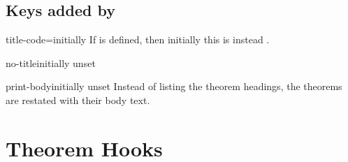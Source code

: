 \documentclass{ltxdoc}
\newcommand{\ttbrackets}[1]{\brackets{\texttt{#1}}}
\begin{document}
\subsection{Keys added by }

\begin{docKey}{title-code}{=}{initially \ttbrackets{\#1}}
If  is defined, then initially this is instead \ttbrackets{\#1}.
\end{docKey}

\begin{docKey}{no-title}{}{initially unset}

\end{docKey}

\begin{docKey}{print-body}{}{initially unset}
Instead of listing the theorem headings, the theorems are restated with their body text.
\end{docKey}

\section{Theorem Hooks} \label{thmkeys-hooks}
\end{document}
